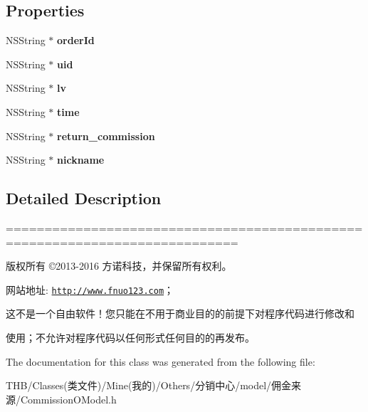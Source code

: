 \subsection*{Properties}
\begin{DoxyCompactItemize}
\item 
\mbox{\label{interface_commission_o_model_a9289927fc4d9ebd50d16ebf20001d98f}} 
N\+S\+String $\ast$ {\bfseries order\+Id}
\item 
\mbox{\label{interface_commission_o_model_a97603d52ff8816278285cbbfb021c1c8}} 
N\+S\+String $\ast$ {\bfseries uid}
\item 
\mbox{\label{interface_commission_o_model_a83d39e466ba4543c10613026a8f8c07b}} 
N\+S\+String $\ast$ {\bfseries lv}
\item 
\mbox{\label{interface_commission_o_model_afb19a26ae3304e681f17fe6961a9d1db}} 
N\+S\+String $\ast$ {\bfseries time}
\item 
\mbox{\label{interface_commission_o_model_a0a6d258faf6fc0fa73c97e45e01c28b9}} 
N\+S\+String $\ast$ {\bfseries return\+\_\+commission}
\item 
\mbox{\label{interface_commission_o_model_a44651556d8d482ad6d11f2de4fbae90e}} 
N\+S\+String $\ast$ {\bfseries nickname}
\end{DoxyCompactItemize}


\subsection{Detailed Description}
============================================================================

版权所有 ©2013-\/2016 方诺科技，并保留所有权利。

网站地址\+: \href{http://www.fnuo123.com}{\tt http\+://www.\+fnuo123.\+com}； 



这不是一个自由软件！您只能在不用于商业目的的前提下对程序代码进行修改和

使用；不允许对程序代码以任何形式任何目的的再发布。 

 

The documentation for this class was generated from the following file\+:\begin{DoxyCompactItemize}
\item 
T\+H\+B/\+Classes(类文件)/\+Mine(我的)/\+Others/分销中心/model/佣金来源/Commission\+O\+Model.\+h\end{DoxyCompactItemize}
